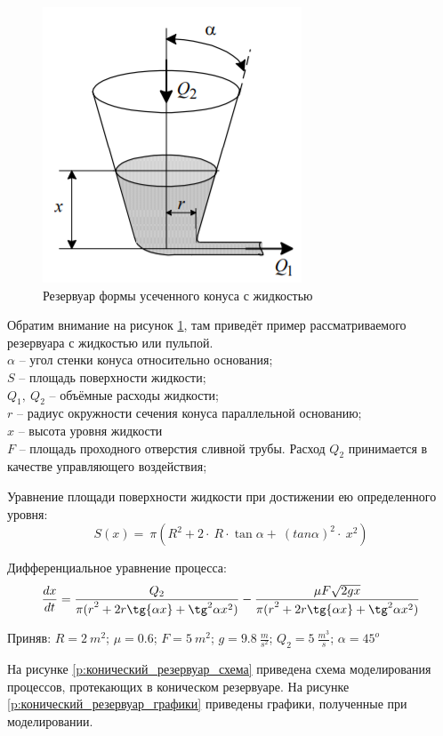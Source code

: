 \documentclass[a4paper, 12pt]{article}
\begin{document}
\begin{figure}[h!]
	\centering
	\includegraphics[scale=0.8]{example_2}
	\caption{ Резервуар формы усеченного конуса с жидкостью  }
	\label{p:Простой_резервуар_конус}
\end{figure}

Обратим внимание на рисунок \ref{p:Простой_резервуар_конус}, там приведёт пример рассматриваемого резервуара с жидкостью или пульпой. \\
$\alpha$ -- угол стенки конуса относительно основания; \\
$S$ -- площадь поверхности жидкости; \\
$Q_1,\ Q_2$  – объёмные расходы жидкости; \\ 
$r$ -- радиус окружности сечения конуса параллельной основанию; \\
$x$ -- высота уровня жидкости \\
$F$ – площадь проходного отверстия сливной трубы. Расход $Q_2$ принимается в качестве управляющего воздействия; 

Уравнение площади поверхности жидкости при достижении ею определенного уровня:
\[ S\left(x\right)=\ \pi(R^2+2\cdot\ R\cdot\tan{\alpha}+\ {(tan{\alpha})}^2\cdot\ x^2) \]

Дифференциальное уравнение процесса:
\[ \frac{dx}{dt}=\frac{Q_2}{{\pi(r}^2+2r\tg{\alpha x}+\tg^2{\alpha x^2})}-\frac{\mu F\sqrt{2gx}}{{\pi(r}^2+2r\tg{\alpha x}+\tg^2{\alpha x^2)}} \]

Приняв:
$R = 2 \ m^2$; 
$\mu = 0.6 $;  
$F = 5 \ m^2$;  
$g = 9.8 \ \frac{m}{s^2}$; 
$Q_2 = 5 \ \frac{m^3}{s}$; 
$\alpha = 45^o $

На рисунке \ref{p:конический_резервуар_схема} приведена схема моделирования процессов, протекающих в коническом резервуаре. На рисунке \ref{p:конический_резервуар_графики} приведены графики, полученные при моделировании. 
\end{document}
